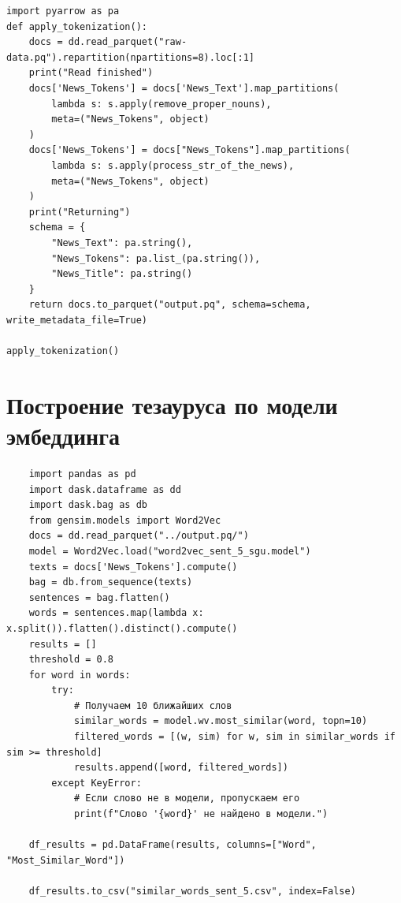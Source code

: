 \documentclass[coursework]{SCWorks}
\begin{document}
\begin{verbatim}
import pyarrow as pa
def apply_tokenization():
    docs = dd.read_parquet("raw-data.pq").repartition(npartitions=8).loc[:1]
    print("Read finished")
    docs['News_Tokens'] = docs['News_Text'].map_partitions(
        lambda s: s.apply(remove_proper_nouns),
        meta=("News_Tokens", object)
    )
    docs['News_Tokens'] = docs["News_Tokens"].map_partitions(
        lambda s: s.apply(process_str_of_the_news),
        meta=("News_Tokens", object)
    )
    print("Returning")
    schema = {
        "News_Text": pa.string(),
        "News_Tokens": pa.list_(pa.string()),
        "News_Title": pa.string()
    }
    return docs.to_parquet("output.pq", schema=schema, write_metadata_file=True)

apply_tokenization()
\end{verbatim}
\section{Построение тезауруса по модели эмбеддинга}
\label{apx:thesaurus}
\begin{verbatim}
    import pandas as pd
    import dask.dataframe as dd
    import dask.bag as db
    from gensim.models import Word2Vec
    docs = dd.read_parquet("../output.pq/")
    model = Word2Vec.load("word2vec_sent_5_sgu.model")
    texts = docs['News_Tokens'].compute()
    bag = db.from_sequence(texts)
    sentences = bag.flatten()
    words = sentences.map(lambda x: x.split()).flatten().distinct().compute()
    results = []
    threshold = 0.8
    for word in words:
        try:
            # Получаем 10 ближайших слов
            similar_words = model.wv.most_similar(word, topn=10)
            filtered_words = [(w, sim) for w, sim in similar_words if sim >= threshold]
            results.append([word, filtered_words])
        except KeyError:
            # Если слово не в модели, пропускаем его
            print(f"Слово '{word}' не найдено в модели.")
    
    df_results = pd.DataFrame(results, columns=["Word", "Most_Similar_Word"])
    
    df_results.to_csv("similar_words_sent_5.csv", index=False)
\end{verbatim}
\end{document}
